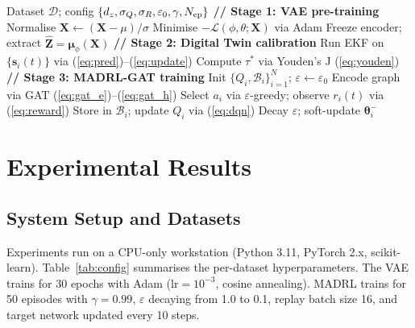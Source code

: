 \documentclass[conference]{IEEEtran}
\begin{document}
\begin{algorithm}[t]
\caption{Proposed Framework: Training Procedure}
\label{alg:main}
\begin{algorithmic}[1]
\REQUIRE Dataset $\mathcal{D}$; config $\{d_z,\sigma_Q,\sigma_R,\varepsilon_0,\gamma,N_{\rm ep}\}$
\STATE \textbf{// Stage 1: VAE pre-training}
\STATE Normalise $\mathbf{X}\leftarrow(\mathbf{X}-\mu)/\sigma$
  \STATE Minimise $-\mathcal{L}(\phi,\theta;\mathbf{X})$ via Adam
\ENDFOR
\STATE Freeze encoder; extract $\hat{\mathbf{Z}}=\bm{\mu}_\phi(\mathbf{X})$
\STATE \textbf{// Stage 2: Digital Twin calibration}
\STATE Run EKF on $\{\mathbf{s}_i(t)\}$ via (\ref{eq:pred})--(\ref{eq:update})
\STATE Compute $\tau^*$ via Youden's J (\ref{eq:youden})
\STATE \textbf{// Stage 3: MADRL-GAT training}
\STATE Init $\{Q_i,\mathcal{B}_i\}_{i=1}^N$; $\varepsilon\leftarrow\varepsilon_0$
    \STATE Encode graph via GAT (\ref{eq:gat_e})--(\ref{eq:gat_h})
    \STATE Select $a_i$ via $\varepsilon$-greedy; observe $r_i(t)$ via (\ref{eq:reward})
    \STATE Store in $\mathcal{B}_i$; update $Q_i$ via (\ref{eq:dqn})
  \ENDFOR
  \STATE Decay $\varepsilon$; soft-update $\bm{\theta}_i^-$
\ENDFOR
\end{algorithmic}
\end{algorithm}

\section{Experimental Results}
\label{sec:experiments}

\subsection{System Setup and Datasets}

Experiments run on a CPU-only workstation (Python 3.11, PyTorch 2.x,
scikit-learn). Table~\ref{tab:config} summarises the per-dataset
hyperparameters. The VAE trains for 30 epochs with Adam
($\mathrm{lr}=10^{-3}$, cosine annealing). MADRL trains for 50 episodes
with $\gamma=0.99$, $\varepsilon$ decaying from 1.0 to 0.1, replay
batch size 16, and target network updated every 10 steps.
\end{document}
